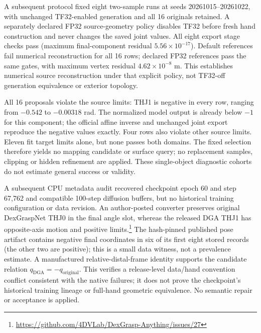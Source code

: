 \documentclass[10pt,letterpaper]{article}
\begin{document}
A subsequent protocol fixed eight two-sample runs at seeds 20261015--20261022,
with unchanged TF32-enabled generation and all 16 originals retained.
A separately declared FP32 source-geometry policy disables TF32 before fresh
hand construction and never changes the saved joint values. All eight export
stage checks pass (maximum final-component residual $5.56\times10^{-17}$).
Default references fail numerical reconstruction for all 16 rows; declared FP32
references pass the same gates, with maximum vertex residual
$4.62\times10^{-8}$ m. This establishes numerical source reconstruction under
that explicit policy, not TF32-off generation equivalence or exterior topology.

All 16 proposals violate the source limits: THJ1 is negative in every row,
ranging from $-0.542$ to $-0.00318$ rad. The normalized model output is already
below $-1$ for this component; the official affine inverse and unchanged joint
export reproduce the negative values exactly. Four rows also violate other
source limits. Eleven fit target limits alone, but none passes both domains.
The fixed selection therefore yields no mapping candidate or surface query;
no replacement samples, clipping or hidden refinement are applied. These
single-object diagnostic cohorts do not estimate general success or validity.

A subsequent CPU metadata audit recovered checkpoint epoch 60 and step 67,762 and
compatible 100-step diffusion buffers, but no historical training configuration
or data revision. An author-posted converter preserves original DexGraspNet
THJ0 in the final angle slot, whereas the released DGA THJ1 has opposite-axis
motion and positive limits.\footnote{\url{https://github.com/4DVLab/DexGrasp-Anything/issues/27}}
The hash-pinned published pose artifact contains negative final coordinates in
six of its first eight stored records (the other two are positive); this is a
small data witness, not a prevalence estimate. A manufactured relative-distal-frame
identity supports the candidate relation $q_{\mathrm{DGA}}=-q_{\mathrm{original}}$.
This verifies a release-level data/hand convention conflict consistent with the
native failures; it does not prove the checkpoint's historical training lineage
or full-hand geometric equivalence. No semantic repair or acceptance is applied.
\end{document}
